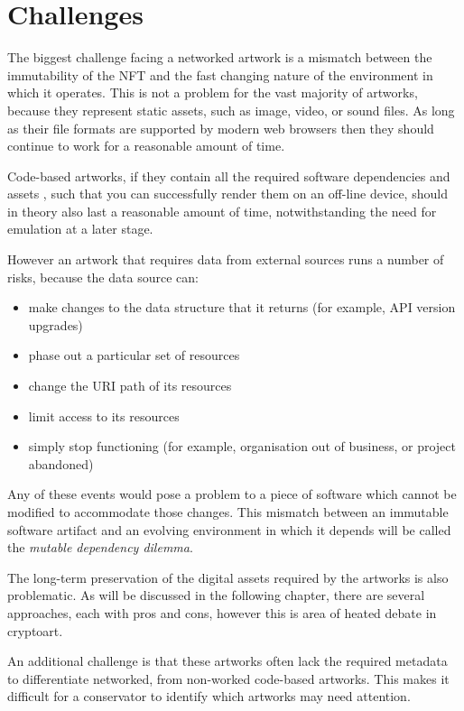 \section{Challenges}
\label{sec:challenges}

The biggest challenge facing a networked artwork is a mismatch between the immutability of the NFT and the fast changing nature of the environment in which it operates. This is not a problem for the vast majority of artworks, because they represent static assets, such as image, video, or sound files. As long as their file formats are supported by modern web browsers then they should continue to work for a reasonable amount of time.

Code-based artworks, if they contain all the required software dependencies and assets , such that you can successfully render them on an off-line device, should in theory also last a reasonable amount of time, notwithstanding the need for emulation at a later stage.

However an artwork that requires data from external sources runs a number of risks, because the data source can:

\begin{itemize}
    \item make changes to the data structure that it returns (for example, API version upgrades)
    \item phase out a particular set of resources
    \item change the URI path of its resources
    \item limit access to its resources
    \item simply stop functioning (for example, organisation out of business, or project abandoned)
\end{itemize}

Any of these events would pose a problem to a piece of software which cannot be modified to accommodate those changes. This mismatch between an immutable software artifact and an evolving environment in which it depends will be called the \emph{mutable dependency dilemma}.

The long-term preservation of the digital assets required by the artworks is also problematic. As will be discussed in the following chapter, there are several approaches, each with pros and cons, however this is area of heated debate in cryptoart.

An additional challenge is that these artworks often lack the required metadata to differentiate networked, from non-worked code-based artworks. This makes it difficult for a conservator to identify which artworks may need attention.

